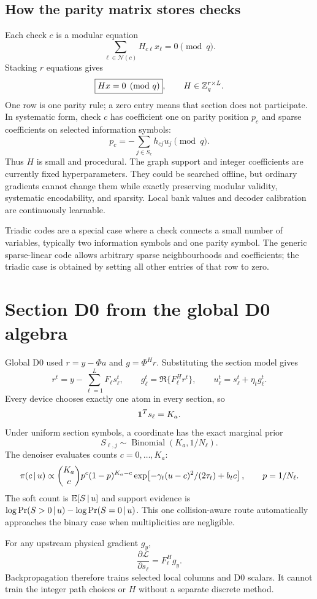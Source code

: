 \documentclass[11pt]{article}
\begin{document}
\subsection{How the parity matrix stores checks}

Each check $c$ is a modular equation
\[
 \sum_{\ell\in\mathcal N(c)}H_{c\ell}x_\ell=0\pmod q.
\]
Stacking $r$ equations gives
\[
 \boxed{Hx=0\pmod q},\qquad H\in\mathbb{Z}_q^{r\times L}.
\]
One row is one parity rule; a zero entry means that section does not participate. In systematic form, check $c$ has
coefficient one on parity position $p_c$ and sparse coefficients on selected information symbols:
\[
 p_c=-\sum_{j\in S_c}h_{cj}u_j\pmod q.
\]
Thus $H$ is small and procedural. The graph support and integer coefficients are currently fixed hyperparameters. They
could be searched offline, but ordinary gradients cannot change them while exactly preserving modular validity,
systematic encodability, and sparsity. Local bank values and decoder calibration are continuously learnable.

Triadic codes are a special case where a check connects a small number of variables, typically two information symbols
and one parity symbol. The generic sparse-linear code allows arbitrary sparse neighbourhoods and coefficients; the
triadic case is obtained by setting all other entries of that row to zero.

\section{Section D0 from the global D0 algebra}

Global D0 used $r=y-\Phi a$ and $g=\Phi^Hr$. Substituting the section model gives
\[
 r^t=y-\sum_{\ell=1}^LF_\ell s_\ell^t,
 \qquad
 g_\ell^t=\Re\{F_\ell^Hr^t\},
 \qquad
 u_\ell^t=s_\ell^t+\eta_tg_\ell^t.
\]
Every device chooses exactly one atom in every section, so
\[
 \mathbf{1}^Ts_\ell=K_a.
\]
Under uniform section symbols, a coordinate has the exact marginal prior
\[
 S_{\ell,j}\sim\operatorname{Binomial}(K_a,1/N_\ell).
\]
The denoiser evaluates counts $c=0,\ldots,K_a$:
\[
 \pi(c\,|\, u)\propto
 \binom{K_a}{c}p^c(1-p)^{K_a-c}
 \exp\!\left[-\gamma_t(u-c)^2/(2\tau_t)+b_tc\right],
 \qquad p=1/N_\ell.
\]
The soft count is $\mathbb E[S\,|\, u]$ and support evidence is
$\log\Pr(S>0\,|\, u)-\log\Pr(S=0\,|\, u)$. This one collision-aware route automatically approaches the binary case
when multiplicities are negligible.

For any upstream physical gradient $g_y$,
\[
 \frac{\partial\mathcal L}{\partial s_\ell}=F_\ell^Hg_y.
\]
Backpropagation therefore trains selected local columns and D0 scalars. It cannot train the integer path choices or $H$
without a separate discrete method.
\end{document}
